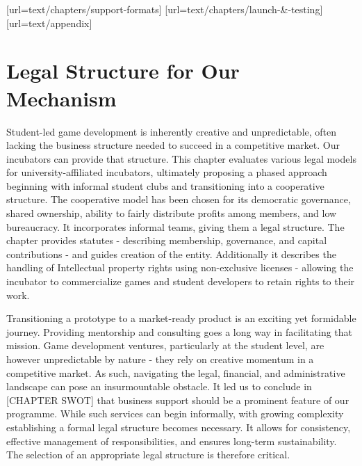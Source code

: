 [url=text/chapters/support-formats]
[url=text/chapters/launch-&-testing]
[url=text/appendix]
\chapter{Legal Structure for Our Mechanism}\label{chap:legal}

\begin{chapterabstract}	
    Student-led game development is inherently creative and unpredictable, often lacking the business structure needed to succeed in a competitive market. Our incubators can provide that structure. This chapter evaluates various legal models for university-affiliated incubators, ultimately proposing a phased approach beginning with informal student clubs and transitioning into a cooperative structure. The cooperative model has been chosen for its democratic governance, shared ownership, ability to fairly distribute profits among members, and low bureaucracy. It incorporates informal teams, giving them a legal structure. The chapter provides statutes - describing membership, governance, and capital contributions - and guides creation of the entity. Additionally it describes the handling of Intellectual property rights using non-exclusive licenses - allowing the incubator to commercialize games and student developers to retain rights to their work.
\end{chapterabstract}

Transitioning a prototype to a market-ready product is an exciting yet formidable journey. Providing mentorship and consulting goes a long way in facilitating that mission. Game development ventures, particularly at the student level, are however unpredictable by nature - they rely on creative momentum in a competitive market. As such, navigating the legal, financial, and administrative landscape can pose an insurmountable obstacle. It led us to conclude in [CHAPTER SWOT] that business support should be a prominent feature of our programme. While such services can begin informally, with growing complexity establishing a formal legal structure becomes necessary. It allows for consistency, effective management of responsibilities, and ensures long-term sustainability. The selection of an appropriate legal structure is therefore critical.

